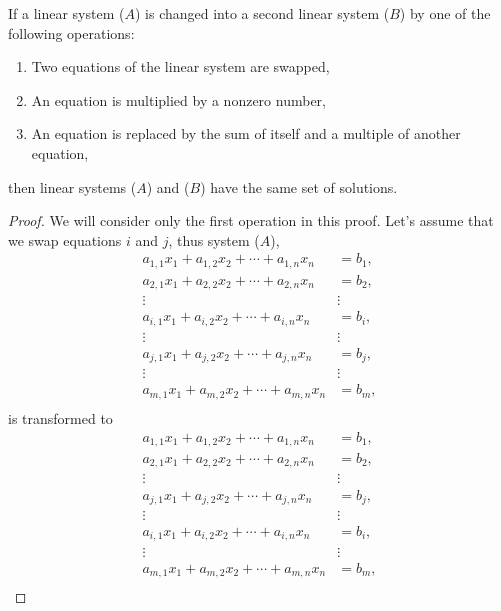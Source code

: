 \begin{theorem} \label{thm:gauss:method}
If a linear system ($A$) is changed into a second linear system ($B$) by one of the following operations:
\begin{enumerate}
\item Two equations of the linear system are swapped,
\item An equation is multiplied by a nonzero number,
\item An equation is replaced by the sum of itself and a multiple of another equation, 
\end{enumerate}
then linear systems ($A$) and ($B$) have the same set of solutions.  
\end{theorem}


\begin{proof}
We will consider only the first operation in this proof.  Let's assume that we swap equations $i$ and $j$, thus system ($A$),  
\begin{align*}
a_{1,1} x_1 + a_{1,2} x_2 + \cdots + a_{1,n} x_n & = b_1 , \\
a_{2,1} x_1 + a_{2,2} x_2 + \cdots + a_{2,n} x_n & = b_2, \\
\vdots \qquad \qquad &  \vdots  \\
a_{i,1} x_1 + a_{i,2} x_2 + \cdots + a_{i,n} x_n & = b_i, \\
\vdots \qquad \qquad &  \vdots  \\
a_{j,1} x_1 + a_{j,2} x_2 + \cdots + a_{j,n} x_n & = b_j, \\
\vdots \qquad \qquad &  \vdots  \\
a_{m,1} x_1 + a_{m,2} x_2 + \cdots + a_{m,n} x_n & = b_m, \\
\end{align*}
is transformed to 
\begin{align*}
a_{1,1} x_1 + a_{1,2} x_2 + \cdots + a_{1,n} x_n & = b_1 , \\
a_{2,1} x_1 + a_{2,2} x_2 + \cdots + a_{2,n} x_n & = b_2, \\
\vdots \qquad \qquad &  \vdots  \\
a_{j,1} x_1 + a_{j,2} x_2 + \cdots + a_{j,n} x_n & = b_j, \\
\vdots \qquad \qquad &  \vdots  \\
a_{i,1} x_1 + a_{i,2} x_2 + \cdots + a_{i,n} x_n & = b_i, \\
\vdots \qquad \qquad &  \vdots  \\
a_{m,1} x_1 + a_{m,2} x_2 + \cdots + a_{m,n} x_n & = b_m, \\
\end{align*}


\end{proof}
